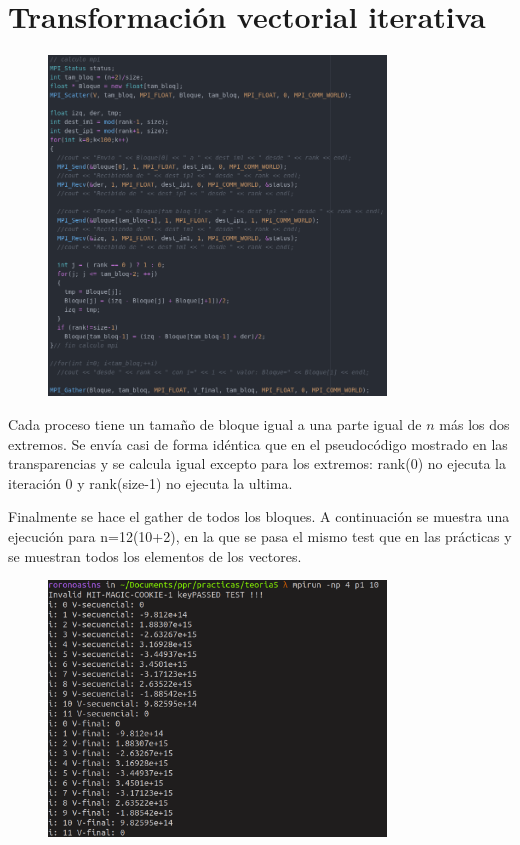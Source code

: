 \section{Transformación vectorial iterativa}

\begin{figure}[H]
\centering
\includegraphics[width=0.8\textwidth]{imagenes/code.png}
\end{figure}

Cada proceso tiene un tamaño de bloque igual a una parte igual de $n$ más los dos extremos. Se envía casi de forma idéntica que en el pseudocódigo mostrado en las transparencias y se calcula igual excepto para los extremos: rank(0) no ejecuta la iteración 0 y rank(size-1) no ejecuta la ultima.

Finalmente se hace el gather de todos los bloques. A continuación se muestra una ejecución para n=12(10+2), en la que se pasa el mismo test que en las prácticas y se muestran todos los elementos de los vectores.

\begin{figure}[H]
\centering
\includegraphics[width=0.8\textwidth]{imagenes/ej.png}
\end{figure}

